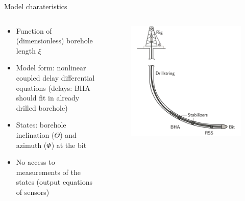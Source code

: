\documentclass[10pt]{beamer}
\begin{document}
\begin{frame}{Model charateristics}
\begin{columns}
\begin{column}{0.5\textwidth}
	\begin{itemize}\setlength\itemsep{1em}
	\item Function of (dimensionless) borehole length $\xi$
	\item Model form: nonlinear coupled delay differential equations (delays: BHA should fit in already drilled borehole)
	\item States: borehole inclination ($\Theta$) and azimuth ($\Phi$) at the bit
	\item No access to measurements of the states (output equations of sensors)
	\end{itemize}
\end{column}
	\begin{column}{0.4\textwidth}
	\begin{figure}[ht]\centering
		\includegraphics[width=1.25\textwidth]{images/drillingsystem.pdf}
	\end{figure}
	\end{column}
\end{columns}
\end{frame}
\end{document}
